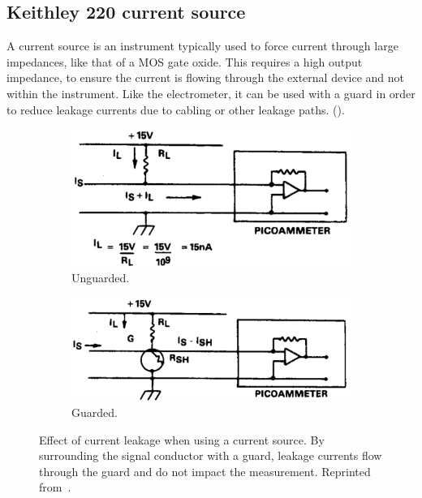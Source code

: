 \subsection{Keithley 220 current source}
A current source is an instrument typically used to force current through large impedances,
like that of a MOS gate oxide.
This requires a high output impedance,
to ensure the current is flowing through the external device
and not within the instrument.
Like the electrometer,
it can be used with a guard
in order to reduce leakage currents
due to cabling or other leakage paths.
().
\begin{figure}[H]
    \begin{subfigure}[b]{\textwidth}
    \centering
        \includegraphics{figuras/instrumental/220unguarded.png}
        \caption{Unguarded.}
    \end{subfigure}
    \begin{subfigure}[b]{\textwidth}
    \centering
        \includegraphics{figuras/instrumental/220guarded.png}
        \caption{Guarded.}
    \end{subfigure}
        \caption{Effect of current leakage when using a current source.
        By surrounding the signal conductor with a guard,
        leakage currents flow through the guard and do not impact the measurement.
    Reprinted from~\cite{keithley_instruments_inc._keithley_1984}.}
    \label{fig:220guard}
\end{figure}
